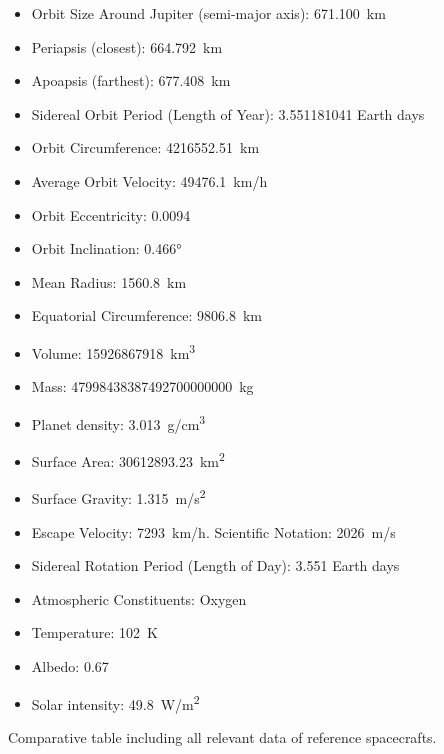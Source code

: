\begin{itemize}
\item{Orbit Size Around Jupiter (semi-major axis):} \SI{671,100}{km}
\item{Periapsis (closest):} \SI{664,792}{km}
\item{Apoapsis (farthest):} \SI{677,408}{km}
\item{Sidereal Orbit Period (Length of Year):} 3.551181041 Earth days
\item{Orbit Circumference:} \SI{4216552.51}{km}
\item{Average Orbit Velocity:} \SI{49476.1}{km/h}
\item{Orbit Eccentricity:} 0.0094
\item{Orbit Inclination:} \ang{0.466}
\item{Mean Radius:} \SI{1560.8}{km}
\item{Equatorial Circumference:} \SI{9806.8}{km}
\item{Volume:} \SI{15926867918}{km^3}
\item{Mass:} \SI{47998438387492700000000}{kg}
\item{Planet density:} \SI{3.013}{g/cm^3}
\item{Surface Area:} \SI{30612893.23}{km^2}
\item{Surface Gravity:} \SI{1.315}{m/s^2}
\item{Escape Velocity:} \SI{7293}{km/h}. Scientific Notation: \SI{2026}{m/s}
\item{Sidereal Rotation Period (Length of Day):} 3.551 Earth days
\item{Atmospheric Constituents:} Oxygen
\item{Temperature:} \SI{102}{K}
\item{Albedo:} 0.67
\item{Solar intensity:} \SI{49.8}{W/m^2}
\end{itemize}



Comparative table including all relevant data of reference
spacecrafts.

